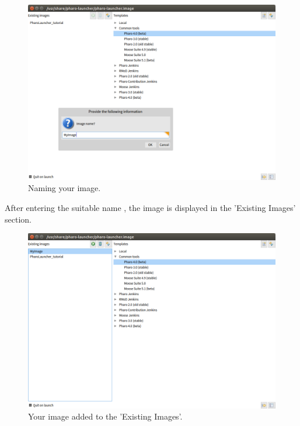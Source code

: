 \documentclass[a4paper,10pt,twoside]{book}
\begin{document}
\begin{figure}

\begin{center}
\includegraphics[width=1.0\textwidth]{figures/rename.png}\caption{Naming your image.\label{namingImage}}\end{center}
\end{figure}


After entering the suitable name , the image is displayed in the 'Existing Images' section.


\begin{figure}

\begin{center}
\includegraphics[width=1.0\textwidth]{figures/myimage.png}\caption{Your image added to the 'Existing Images'.\label{imageAdded}}\end{center}
\end{figure}
\end{document}
